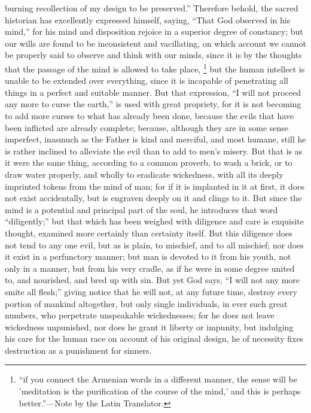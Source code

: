 burning recollection of my design to be preserved.'' Therefore behold, the sacred historian has
excellently expressed himself, saying, ``That God observed in his mind,'' for his mind and
disposition rejoice in a superior degree of constancy; but our wills are found to be inconsistent and
vacillating, on which account we cannot be properly said to observe and think with our minds, since
it is by the thoughts that the passage of the mind is allowed to take place, \footnote{``if you connect the Armenian
words in a different manner, the sense will be 'meditation is the purification of the course of the mind,' and this is perhaps
better.''—Note by the Latin Translator.} but the human intellect is unable to be extended over everything,
since it is incapable of penetrating all things in a perfect and suitable manner. But that expression,
``I will not proceed any more to curse the earth,'' is used with great propriety, for it is not becoming
to add more curses to what has already been done, because the evils that have been inflicted are
already complete; because, although they are in some sense imperfect, inasmuch as the Father is
kind and merciful, and most humane, still he is rather inclined to alleviate the evil than to add to
men's misery. But that is as it were the same thing, according to a common proverb, to wash a
brick, or to draw water properly, and wholly to eradicate wickedness, with all its deeply imprinted
tokens from the mind of man; for if it is implanted in it at first, it does not exist accidentally, but is
engraven deeply on it and clings to it. But since the mind is a potential and principal part of the soul,
he introduces that word ``diligently;'' but that which has been weighed with diligence and care is
exquisite thought, examined more certainly than certainty itself. But this diligence does not tend to
any one evil, but as is plain, to mischief, and to all mischief; nor does it exist in a perfunctory
manner; but man is devoted to it from his youth, not only in a manner, but from his very cradle, as if
he were in some degree united to, and nourished, and bred up with sin. But yet God says, ``I will not
any more smite all flesh;'' giving notice that he will not, at any future time, destroy every portion of
mankind altogether, but only single individuals, in ever such great numbers, who perpetrate
unspeakable wickednesses; for he does not leave wickedness unpunished, nor does he grant it
liberty or impunity, but indulging his care for the human race on account of his original design, he of
necessity fixes destruction as a punishment for sinners.

